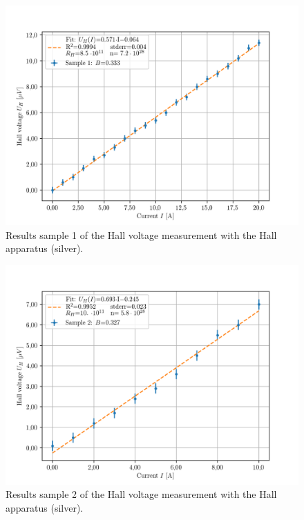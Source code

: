     \begin{figure}[!htbp]
    \begin{center}
    \includegraphics[scale=0.8]{figuren/resultaten/sample1.png}
    \end{center}
    \caption{Results sample 1 of the Hall voltage measurement with the Hall apparatus (silver).}\label{fig:silver1}
    \end{figure}
    

    \begin{figure}[!htbp]
    \begin{center}
    \includegraphics[scale=0.8]{figuren/resultaten/sample2.png}
    \end{center}
    \caption{Results sample 2 of the Hall voltage measurement with the Hall apparatus (silver).}\label{fig:silver2}
    \end{figure}
    
